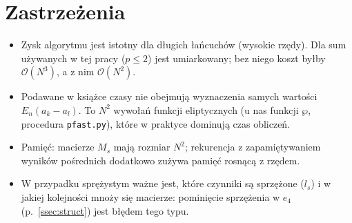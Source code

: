 \documentclass[12pt,a4paper,twoside,openright]{report}
\theoremstyle{definition}
\theoremstyle{remark}
\begin{document}
{\section{Zastrzeżenia}
\begin{itemize}
\item Zysk algorytmu jest istotny dla długich łańcuchów (wysokie rzędy). Dla sum używanych w tej pracy ($p\le2$) jest umiarkowany; bez niego koszt byłby $\mathcal O(N^3)$, a z nim $\mathcal O(N^2)$.
\item Podawane w książce czasy nie obejmują wyznaczenia samych wartości $E_n(a_k-a_l)$. To $N^2$ wywołań funkcji eliptycznych (u nas funkcji $\wp$, procedura \texttt{pfast.py}), które w praktyce dominują czas obliczeń.
\item Pamięć: macierze $M_s$ mają rozmiar $N^2$; rekurencja z zapamiętywaniem wyników pośrednich dodatkowo zużywa pamięć rosnącą z rzędem.
\item W przypadku sprężystym ważne jest, które czynniki są sprzężone ($l_s$) i w jakiej kolejności mnoży się macierze: pominięcie sprzężenia w $e_4$ (p.~\ref{ssec:struct}) jest błędem tego typu.
\end{itemize}
}
\end{document}
